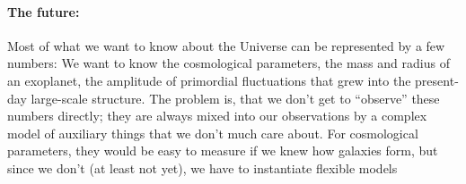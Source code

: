 \documentclass[11pt, letterpaper]{article}
\begin{document}
\paragraph{The future:}
Most of what we want to know about the Universe can be represented by a few numbers:
We want to know the cosmological parameters, the mass and radius of an exoplanet,
  the amplitude of primordial fluctuations that grew into the present-day large-scale structure.
The problem is, that we don't get to ``observe'' these numbers directly;
  they are always mixed into our observations by a complex model of auxiliary things that we don't much care about.
For cosmological parameters, they would be easy to measure if we knew how galaxies form,
  but since we don't (at least not yet), we have to instantiate flexible models
\end{document}
